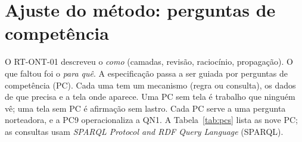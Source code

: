 \documentclass[12pt,a4paper,oneside,english,brazil]{abntex2}
\begin{document}
\chapter{Ajuste do método: perguntas de competência}\label{cap:pc}

O RT-ONT-01 descreveu o \emph{como} (camadas, revisão, raciocínio, propagação). O que faltou foi o \emph{para quê}. A especificação passa a ser guiada por perguntas de competência (PC). Cada uma tem um mecanismo (regra ou consulta), os dados de que precisa e a tela onde aparece. Uma PC sem tela é trabalho que ninguém vê; uma tela sem PC é afirmação sem lastro. Cada PC serve a uma pergunta norteadora, e a PC9 operacionaliza a QN1. A Tabela~\ref{tab:pcs} lista as nove PC; as consultas usam \emph{SPARQL Protocol and RDF Query Language} (SPARQL).
\end{document}

